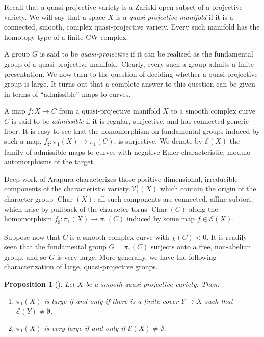 \documentclass{article}
\numberwithin{equation}{section}
\newtheorem{proposition}[theorem]{Proposition}
\theoremstyle{definition}
\newcommand{\VV}{\mathcal{V}}
\newcommand{\cE}{\mathcal{E}}
\DeclareMathOperator{\Char}{Char}
\begin{document}
Recall that a quasi-projective variety is a Zariski open subset of 
a projective variety.  We will say that a space $X$ is a 
{\em quasi-projective manifold}\/ if it is a connected, 
smooth, complex quasi-projective variety. Every such 
manifold has the homotopy type of a finite CW-complex.

A group $G$ is said to be {\em quasi-projective}\/ if it can be 
realized as the fundamental group of a quasi-projective manifold. 
Clearly, every such a group admits a finite presentation. 
 We now turn to the question of deciding whether 
a quasi-projective group is large.  It turns out that a complete answer 
to this question can be given in terms of ``admissible'' maps to curves.

A map $f\colon X \to C$ from a quasi-projective manifold $X$ to a 
smooth complex curve $C$ is said to be {\em admissible}\/ if it is 
regular, surjective, and has connected generic fiber. 
It is easy to see that the homomorphism on 
fundamental groups induced by such a map, 
$f_{\sharp}\colon \pi_1(X)\to \pi_1(C)$, is surjective. 
We denote by $\cE(X)$ the family of admissible 
maps to curves with negative Euler characteristic, 
modulo automorphisms of the target.  

Deep work of Arapura \cite{Ar} characterizes   
those positive-dimensional, irreducible components of the characteristic 
variety $\VV^1_1(X)$ which contain the origin of the character 
group $\Char(X)$: all such components are connected, 
affine subtori, which arise by pullback of the character torus 
$\Char(C)$ along the homomorphism 
$f_{\sharp}\colon \pi_1(X)\to \pi_1(C)$ induced 
by some map $f\in \cE(X)$. 

Suppose now that $C$ is a smooth complex curve with $\chi(C)<0$.  It is 
readily seen that the fundamental group $G=\pi_1(C)$ surjects onto 
a free, non-abelian group, and so $G$ is very large. More 
generally, we have the following characterization of large, 
quasi-projective groups.

\begin{proposition}[\cite{PS-jlms}]
\label{prop:qproj}
Let $X$ be a smooth quasi-projective variety.  Then:
\begin{enumerate}
\item  \label{lg1}
$\pi_1(X)$ is large if and only if there is a finite cover $Y\to X$ such that 
$\mathcal{E}(Y)\ne \emptyset$. 
\item \label{lg2}
$\pi_1(X)$ is very large if and only if $\mathcal{E}(X)\ne \emptyset$. 
\end{enumerate}
\end{proposition}
\end{document}
